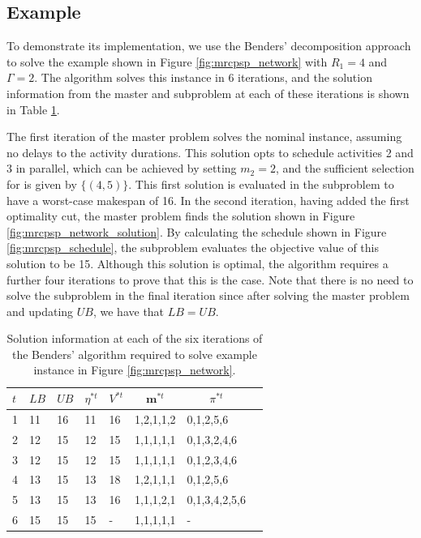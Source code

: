 \documentclass[a4paper,abstracton]{scrartcl}
\begin{document}
\subsection{Example}

To demonstrate its implementation, we use the Benders' decomposition approach to solve the example shown in Figure \ref{fig:mrcpsp_network} with $R_1=4$ and $\Gamma=2$. The algorithm solves this instance in 6 iterations, and the solution information from the master and subproblem at each of these iterations is shown in Table \ref{table:benders_example}.

The first iteration of the master problem solves the nominal instance, assuming no delays to the activity durations. This solution opts to schedule activities 2 and 3 in parallel, which can be achieved by setting $m_2=2$, and the sufficient selection for is given by $\{(4,5)\}$. This first solution is evaluated in the subproblem to have a worst-case makespan of 16. In the second iteration, having added the first optimality cut, the master problem finds the solution shown in Figure \ref{fig:mrcpsp_network_solution}. By calculating the schedule shown in Figure \ref{fig:mrcpsp_schedule}, the subproblem evaluates the objective value of this solution to be 15. Although this solution is optimal, the algorithm requires a further four iterations to prove that this is the case. Note that there is no need to solve the subproblem in the final iteration since after solving the master problem and updating $UB$, we have that $LB=UB$.
\begin{table}[h]
\centering
{\renewcommand{\arraystretch}{1.2}  %
\begin{tabular}{llllllll}
	\hline \hline
	$t$ & $LB$ & $UB$ & $\eta^{*t}$ & $V^{*t}$ & \multicolumn{1}{c}{$\bm{m}^{*t}$}     & \multicolumn{1}{c}{$\pi^{*t}$}  \\
	\hline
1         & 11 & 16 & 11          & 16                                  & 1,2,1,1,2 & 0,1,2,5,6 \\
2         & 12 & 15 & 12          & 15                                  & 1,1,1,1,1 & 0,1,3,2,4,6 \\
3         & 12 & 15 & 12          & 15                                  & 1,1,1,1,1 & 0,1,2,3,4,6 \\
4         & 13 & 15 & 13          & 18                                  & 1,2,1,1,1 & 0,1,2,5,6 \\
5         & 13 & 15 & 13          & 16                                  & 1,1,1,2,1 & 0,1,3,4,2,5,6 \\
6         & 15 & 15 & 15          & -                                   & 1,1,1,1,1 & - \\
	\hline \hline
\end{tabular}
\caption{Solution information at each of the six iterations of the Benders' algorithm required to solve example instance in Figure \ref{fig:mrcpsp_network}.}
\label{table:benders_example}
}
\end{table}
\end{document}
